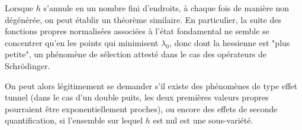 Lorsque $h$ s'annule en un nombre fini d'endroits, à chaque fois de manière non dégénérée, on peut établir un théorème similaire. En particulier, la suite des fonctions propres normalisées associées à l'état fondamental ne semble se concentrer qu'en les points qui minimisent $\lambda_0$, donc dont la hessienne est "plus petite", un phénomène de sélection attesté dans le cas des opérateurs de Schr\"odinger.

On peut alors légitimement se demander s'il existe des phénomènes de type effet tunnel (dans le cas d'un double puits, les deux premières valeurs propres pourraient être exponentiellement proches), ou encore des effets de seconde quantification, si l'ensemble sur lequel $h$ est nul est une sous-variété.